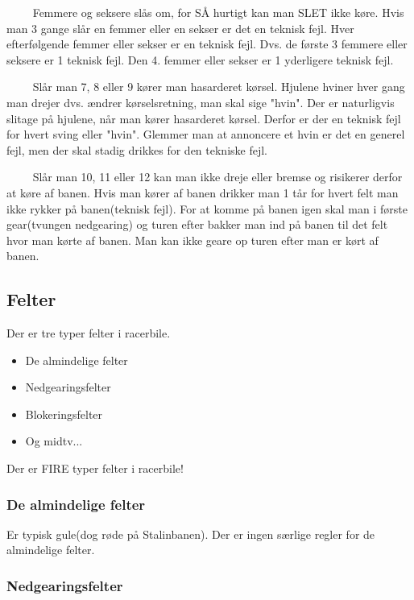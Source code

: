 \documentclass[12pt]{article}
\begin{document}
$\qquad$ Femmere og seksere slås om, for SÅ hurtigt kan man SLET ikke køre. Hvis man 3 gange slår en femmer eller en sekser er det en teknisk fejl. Hver efterfølgende femmer eller sekser er en teknisk fejl. Dvs. de første 3 femmere eller seksere er 1 teknisk fejl. Den 4. femmer eller sekser er 1 yderligere teknisk fejl.

$\qquad$ Slår man 7, 8 eller 9 kører man hasarderet kørsel. Hjulene hviner hver gang man drejer dvs. ændrer kørselsretning, man skal sige "hvin". Der er naturligvis slitage på hjulene, når man kører hasarderet kørsel. Derfor er der en teknisk fejl for hvert sving eller "hvin". Glemmer man at annoncere et hvin er det en generel fejl, men der skal stadig drikkes for den tekniske fejl.

$\qquad$  Slår man 10, 11 eller 12 kan man ikke dreje eller bremse og risikerer derfor at køre af banen. Hvis man kører af banen drikker man 1 tår for hvert felt man ikke rykker på banen(teknisk fejl). For at komme på banen igen skal man i første gear(tvungen nedgearing) og turen efter bakker man ind på banen til det felt hvor man kørte af banen. Man kan ikke geare op turen efter man er kørt af banen.

\subsection*{Felter}

Der er tre typer felter i racerbile.

\begin{itemize}
	\item De almindelige felter
	\item Nedgearingsfelter
	\item Blokeringsfelter
	\item Og midtv...
\end{itemize}

Der er FIRE typer felter i racerbile!

\subsubsection*{De almindelige felter}

Er typisk gule(dog røde på Stalinbanen). Der er ingen særlige regler for de almindelige felter.

\subsubsection*{Nedgearingsfelter}
\end{document}

